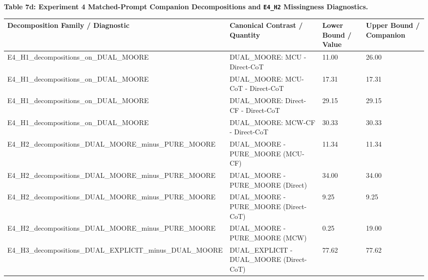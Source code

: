 \documentclass[11pt,a4paper]{article}
\begin{document}
\textbf{Table 7d: Experiment 4 Matched-Prompt Companion Decompositions and \texttt{E4\_\allowbreak{}H2} Missingness Diagnostics.}

\begin{center}\begingroup\small\setlength{\tabcolsep}{4.5pt}\renewcommand{\arraystretch}{1.12}\begin{adjustbox}{max width=\textwidth}\begin{tabular}{llll}\toprule
\textbf{Decomposition Family / Diagnostic} & \textbf{Canonical Contrast / Quantity} & \textbf{Lower Bound / Value} & \textbf{Upper Bound / Companion} \\ \midrule
E4\_\allowbreak{}H1\_\allowbreak{}decompositions\_\allowbreak{}on\_\allowbreak{}DUAL\_\allowbreak{}MOORE & DUAL\_\allowbreak{}MOORE: MCU - Direct-CoT & 11.00 & 26.00 \\
E4\_\allowbreak{}H1\_\allowbreak{}decompositions\_\allowbreak{}on\_\allowbreak{}DUAL\_\allowbreak{}MOORE & DUAL\_\allowbreak{}MOORE: MCU-CoT - Direct-CoT & 17.31 & 17.31 \\
E4\_\allowbreak{}H1\_\allowbreak{}decompositions\_\allowbreak{}on\_\allowbreak{}DUAL\_\allowbreak{}MOORE & DUAL\_\allowbreak{}MOORE: Direct-CF - Direct-CoT & 29.15 & 29.15 \\
E4\_\allowbreak{}H1\_\allowbreak{}decompositions\_\allowbreak{}on\_\allowbreak{}DUAL\_\allowbreak{}MOORE & DUAL\_\allowbreak{}MOORE: MCW-CF - Direct-CoT & 30.33 & 30.33 \\
E4\_\allowbreak{}H2\_\allowbreak{}decompositions\_\allowbreak{}DUAL\_\allowbreak{}MOORE\_\allowbreak{}minus\_\allowbreak{}PURE\_\allowbreak{}MOORE & DUAL\_\allowbreak{}MOORE - PURE\_\allowbreak{}MOORE (MCU-CF) & 11.34 & 11.34 \\
E4\_\allowbreak{}H2\_\allowbreak{}decompositions\_\allowbreak{}DUAL\_\allowbreak{}MOORE\_\allowbreak{}minus\_\allowbreak{}PURE\_\allowbreak{}MOORE & DUAL\_\allowbreak{}MOORE - PURE\_\allowbreak{}MOORE (Direct) & 34.00 & 34.00 \\
E4\_\allowbreak{}H2\_\allowbreak{}decompositions\_\allowbreak{}DUAL\_\allowbreak{}MOORE\_\allowbreak{}minus\_\allowbreak{}PURE\_\allowbreak{}MOORE & DUAL\_\allowbreak{}MOORE - PURE\_\allowbreak{}MOORE (Direct-CoT) & 9.25 & 9.25 \\
E4\_\allowbreak{}H2\_\allowbreak{}decompositions\_\allowbreak{}DUAL\_\allowbreak{}MOORE\_\allowbreak{}minus\_\allowbreak{}PURE\_\allowbreak{}MOORE & DUAL\_\allowbreak{}MOORE - PURE\_\allowbreak{}MOORE (MCW) & 0.25 & 19.00 \\
E4\_\allowbreak{}H3\_\allowbreak{}decompositions\_\allowbreak{}DUAL\_\allowbreak{}EXPLICIT\_\allowbreak{}minus\_\allowbreak{}DUAL\_\allowbreak{}MOORE & DUAL\_\allowbreak{}EXPLICIT - DUAL\_\allowbreak{}MOORE (Direct-CoT) & 77.62 & 77.62 \\

\end{tabular}
\end{adjustbox}
\end{center}
\end{document}
